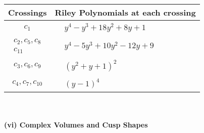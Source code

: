\documentclass[1p]{elsarticle_modified}
\theoremstyle{definition}
\begin{document}
\begin{tabular}{m{50pt}|m{274pt}}
Crossings & \hspace{64pt}Riley Polynomials at each crossing \\
\hline $$\begin{aligned}c_{1}\end{aligned}$$&$\begin{aligned}
&y^4- y^3+18 y^2+8 y+1
\end{aligned}$\\
\hline $$\begin{aligned}c_{2},c_{5},c_{8}\\c_{11}\end{aligned}$$&$\begin{aligned}
&y^4-5 y^3+10 y^2-12 y+9
\end{aligned}$\\
\hline $$\begin{aligned}c_{3},c_{6},c_{9}\end{aligned}$$&$\begin{aligned}
&(y^2+y+1)^2
\end{aligned}$\\
\hline $$\begin{aligned}c_{4},c_{7},c_{10}\end{aligned}$$&$\begin{aligned}
&(y-1)^4
\end{aligned}$\\
\hline
\end{tabular}\\~\\
\newpage\flushleft \textbf{(vi) Complex Volumes and Cusp Shapes}
\end{document}
